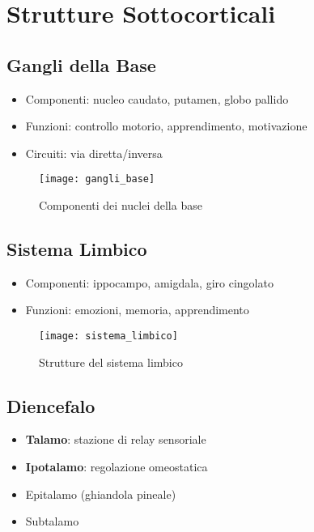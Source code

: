 \documentclass[12pt]{article}
\begin{document}
\section{Strutture Sottocorticali}
\subsection{Gangli della Base}
\begin{itemize}
    \item Componenti: nucleo caudato, putamen, globo pallido
    \item Funzioni: controllo motorio, apprendimento, motivazione
    \item Circuiti: via diretta/inversa
\end{itemize}

\begin{figure}[h]
    \centering
    \texttt{[image: gangli\_base]}
    \caption{Componenti dei nuclei della base}
\end{figure}

\subsection{Sistema Limbico}
\begin{itemize}
    \item Componenti: ippocampo, amigdala, giro cingolato
    \item Funzioni: emozioni, memoria, apprendimento
\end{itemize}

\begin{figure}[h]
    \centering
    \texttt{[image: sistema\_limbico]}
    \caption{Strutture del sistema limbico}
\end{figure}

\subsection{Diencefalo}
\begin{itemize}
    \item \textbf{Talamo}: stazione di relay sensoriale
    \item \textbf{Ipotalamo}: regolazione omeostatica
    \item Epitalamo (ghiandola pineale)
    \item Subtalamo
\end{itemize}
\end{document}
